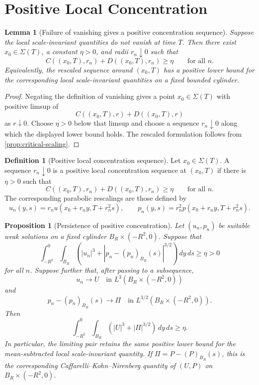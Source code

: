 \documentclass[11pt]{amsart}
\theoremstyle{plain}
\newtheorem{lemma}[lemma]{Lemma}
\newtheorem{proposition}[proposition]{Proposition}
\theoremstyle{definition}
\newtheorem{definition}[definition]{Definition}
\theoremstyle{remark}
\begin{document}
\section{Positive Local Concentration}

\begin{lemma}[Failure of vanishing gives a positive concentration sequence]
\label{lem:positive-concentration}
Suppose the local scale-invariant quantities do not vanish at time \(T\).  Then
there exist \(x_0\in\Sigma(T)\), a constant \(\eta>0\), and radii
\(r_n\downarrow0\) such that
\[
  C((x_0,T),r_n)+D((x_0,T),r_n)\ge\eta
  \qquad\text{for all }n.
\]
Equivalently, the rescaled sequence around \((x_0,T)\) has a positive lower
bound for the corresponding local scale-invariant quantities on a fixed
bounded cylinder.
\end{lemma}

\begin{proof}
Negating the definition of vanishing gives a point \(x_0\in\Sigma(T)\) with
positive limsup of
\[
  C((x_0,T),r)+D((x_0,T),r)
\]
as \(r\downarrow0\).  Choose \(\eta>0\) below that limsup and choose a sequence
\(r_n\downarrow0\) along which the displayed lower bound holds.  The rescaled
formulation follows from \cref{prop:critical-scaling}.
\end{proof}

\begin{definition}[Positive local concentration sequence]
\label{def:positive-concentration-sequence}
Let \(x_0\in\Sigma(T)\).  A sequence \(r_n\downarrow0\) is a positive local
concentration sequence at \((x_0,T)\) if there is \(\eta>0\) such that
\[
  C((x_0,T),r_n)+D((x_0,T),r_n)\ge\eta
  \qquad\text{for all }n.
\]
The corresponding parabolic rescalings are those defined by
\[
  u_n(y,s)=r_nu(x_0+r_ny,T+r_n^2s),
  \qquad
  p_n(y,s)=r_n^2p(x_0+r_ny,T+r_n^2s).
\]
\end{definition}

\begin{proposition}[Persistence of positive concentration]
\label{prop:compactness-persistence}
Let \((u_n,p_n)\) be suitable weak solutions on a fixed cylinder
\(B_R\times(-R^2,0)\).  Suppose that
\[
  \int_{-R^2}^{0}\int_{B_R}
  \left(|u_n|^3+|p_n-(p_n)_{B_R}(s)|^{3/2}\right)\,dy\,ds
  \ge\eta>0
\]
for all \(n\).  Suppose further that, after passing to a subsequence,
\[
  u_n\to U\quad\text{in }L^3(B_R\times(-R^2,0))
\]
and
\[
  p_n-(p_n)_{B_R}(s)\to \Pi
  \quad\text{in }L^{3/2}(B_R\times(-R^2,0)).
\]
Then
\[
  \int_{-R^2}^{0}\int_{B_R}
  \left(|U|^3+|\Pi|^{3/2}\right)\,dy\,ds\ge\eta.
\]
In particular, the limiting pair retains the same positive lower bound for the
mean-subtracted local scale-invariant quantity.  If
\(\Pi=P-(P)_{B_R}(s)\), this is the corresponding
Caffarelli--Kohn--Nirenberg quantity of \((U,P)\) on
\(B_R\times(-R^2,0)\).
\end{proposition}
\end{document}
